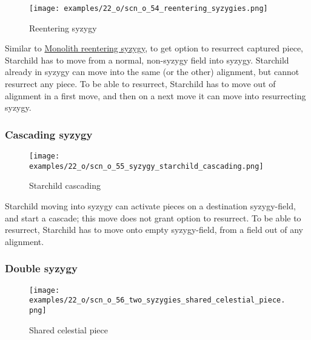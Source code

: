 \vspace*{-1.2\baselineskip}
\noindent
\begin{figure}[!h]
\texttt{[image: examples/22\_o/scn\_o\_54\_reentering\_syzygies.png]}
\caption{Reentering syzygy}
\label{fig:scn_o_54_reentering_syzygies}
\end{figure}

Similar to
\hyperref[fig:scn_d_26_syzygy_reentering_same_move]{Monolith reentering syzygy},
to get option to resurrect captured piece, Starchild has to move from a normal,
non-syzygy field into syzygy. Starchild already in syzygy can move into the same
(or the other) alignment, but cannot resurrect any piece. To be able to resurrect,
Starchild has to move out of alignment in a first move, and then on a next move
it can move into resurrecting syzygy.

\clearpage %

\subsubsection*{Cascading syzygy}
\label{sec:One/Starchild/Syzygy/Cascading syzygy}

\vspace*{-1.2\baselineskip}
\noindent
\begin{figure}[!h]
\texttt{[image: examples/22\_o/scn\_o\_55\_syzygy\_starchild\_cascading.png]}
\caption{Starchild cascading}
\label{fig:scn_o_55_syzygy_starchild_cascading}
\end{figure}

Starchild moving into syzygy can activate pieces on a destination syzygy-field,
and start a cascade; this move does not grant option to resurrect. To be able to
resurrect, Starchild has to move onto empty syzygy-field, from a field out of
any alignment.

\clearpage %

\subsubsection*{Double syzygy}
\label{sec:One/Starchild/Syzygy/Double syzygy}

\vspace*{-1.2\baselineskip}
\noindent
\begin{figure}[!h]
\texttt{[image: examples/22\_o/scn\_o\_56\_two\_syzygies\_shared\_celestial\_piece.png]}
\caption{Shared celestial piece}
\label{fig:scn_o_56_two_syzygies_shared_celestial_piece}
\end{figure}

